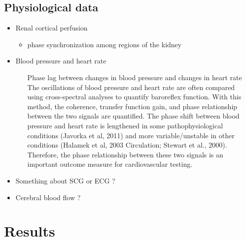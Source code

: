\documentclass{article}
\begin{document}
\begin{itemize}
\subsection*{Physiological data}
\begin{itemize}
\item Renal cortical perfusion
	\begin{itemize}
	\item phase synchronization among regions of the kidney
	\end{itemize}
\item Blood pressure and heart rate
	\begin{itemize}
	\item [Phase lag between changes in blood pressure and changes in heart rate] \hfill \\
	The oscillations of blood pressure and heart rate are often compared using cross-spectral analyses to quantify baroreflex function.  With this method, the coherence, transfer function gain, and phase relationship between the two signals are quantified.  The phase shift between blood pressure and heart rate is lengthened in some pathophysiological conditions (Javorka et al, 2011) and more variable/unstable in other conditions (Halamek et al, 2003 Circulation; Stewart et al., 2000).  Therefore, the phase relationship between these two signals is an important outcome measure for cardiovascular testing.  
	\end{itemize}
\item Something about SCG or ECG ?
\item Cerebral blood flow ?
\end{itemize}

\end{itemize}

\section*{Results}
\end{document}
